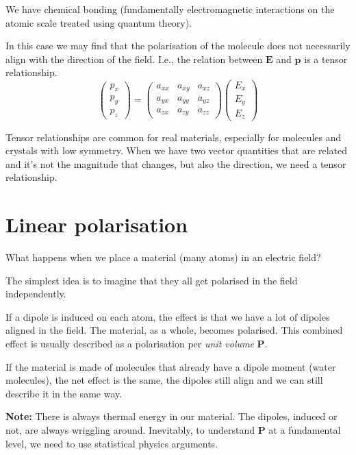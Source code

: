 \documentclass[12pt,chapterprefix=false,dvipsnames]{scrbook}
\theoremstyle{dotless}
\theoremstyle{definition}
\begin{document}
We have chemical bonding (fundamentally electromagnetic
interactions on the atomic scale treated using quantum theory).

In this case we may find that the polarisation of the molecule
does not necessarily align with the direction of the field.
I.e., the relation between $\bm{E}$ and
$\bm{p}$ is a tensor relationship.
\begin{equation}
	\begin{pmatrix}
		p_{x} \\
		p_{y} \\
		p_{z}
	\end{pmatrix} =
	\begin{pmatrix}
		a_{xx} & a_{xy} & a_{xz} \\
		a_{yx} & a_{yy} & a_{yz} \\
		a_{zx} & a_{zy} & a_{zz}
	\end{pmatrix}
	\begin{pmatrix}
		E_{x} \\
		E_{y} \\
		E_{z}
	\end{pmatrix}
\end{equation}

Tensor relationships are common for real materials, especially
for molecules and crystals with low symmetry. When we have two
vector quantities that are related and it's not the magnitude
that changes, but also the direction, we need a tensor
relationship.

\section{Linear polarisation}%
\label{sec:linear_polarisation}

What happens when we place a material (many atoms) in an
electric field?

The simplest idea is to imagine that they all get polarised in
the field independently.

If a dipole is induced on each atom, the effect is that we have
a lot of dipoles aligned in the field. The material, as a whole,
becomes polarised. This combined effect is usually described as
a polarisation per \textit{unit volume}
$\bm{P}$.

If the material is made of molecules that already have a dipole
moment (water molecules), the net effect is the same, the
dipoles still align and we can still describe it in the same
way.

\textbf{Note:} There is always thermal energy in our
material. The dipoles, induced or not, are always wriggling
around. Inevitably, to understand $\bm{P}$ at a
fundamental level, we need to use statistical physics arguments.
\end{document}

